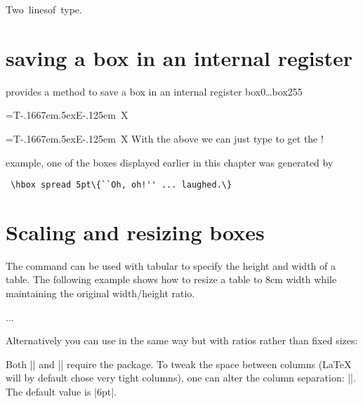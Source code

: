 {\begin{marginfigure}
\end{marginfigure}

\vbox{\hbox{Two lines}\hbox{of type.}}

\section{saving a box in an internal register}
\tex provides a method to save a box in an internal register box0\ldots box255

\begin{teX}
=\hbox{T\kern-.1667em\lower.5ex\hbox{E}\kern-.125em X}
\end{teX}

=\hbox{T\kern-.1667em\lower.5ex\hbox{E}\kern-.125em X}
With the above we can just type  to get the  !


example, one of the boxes displayed earlier in this chapter was generated by

\medskip
\verb+ \hbox spread 5pt\{``Oh, oh!'' ... laughed.\}+
\medskip

\section*{Scaling and resizing boxes}

The command  can be used with tabular to specify the height and width of a table. The following example shows how to resize a table to 8cm width while maintaining the original width/height ratio.

\begin{teX}
\resizebox{8cm}{!} {
  \begin{tabular}...
  \end{tabular}
}
\end{teX}

Alternatively you can use  in the same way but with ratios rather than fixed sizes:

\begin{teX}
\scalebox{0.7}{
  \begin{tabular}...
  \end{tabular}
}
\end{teX}

Both |\resizebox| and |\scalebox| require the  package.
To tweak the space between columns (LaTeX will by default chose very tight columns), one can alter the column separation: |\setlength{\tabcolsep}{5pt}|. The default value is |6pt|.

}
